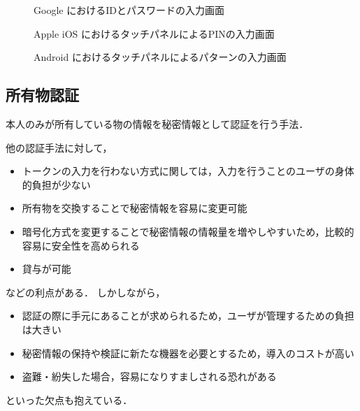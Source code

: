 \begin{figure}[th]
\begin{center}
\end{center}
\caption{Google におけるIDとパスワードの入力画面}
\label{fig:loginGoogleWithIDAndPass}
\end{figure}

\begin{figure}[th]
\begin{center}
\end{center}
\caption{Apple iOS におけるタッチパネルによるPINの入力画面}
\label{fig:iosPIN}
\end{figure}

\begin{figure}[th]
\begin{center}
\end{center}
\caption{Android におけるタッチパネルによるパターンの入力画面}
\label{fig:androidPatternLock}
\end{figure}

\subsection{所有物認証}\label{subsec:possession}
本人のみが所有している物の情報を秘密情報として認証を行う手法．

他の認証手法に対して，
\begin{itemize}
\item トークンの入力を行わない方式に関しては，入力を行うことのユーザの身体的負担が少ない
\item 所有物を交換することで秘密情報を容易に変更可能
\item 暗号化方式を変更することで秘密情報の情報量を増やしやすいため，比較的容易に安全性を高められる
\item 貸与が可能
\end{itemize}
などの利点がある．
しかしながら，
\begin{itemize}
\item 認証の際に手元にあることが求められるため，ユーザが管理するための負担は大きい
\item 秘密情報の保持や検証に新たな機器を必要とするため，導入のコストが高い
\item 盗難・紛失した場合，容易になりすましされる恐れがある
\end{itemize}
といった欠点も抱えている．

